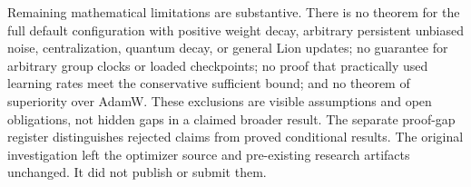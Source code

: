 \documentclass[11pt]{article}
\theoremstyle{definition}
\theoremstyle{remark}
\begin{document}
Remaining mathematical limitations are substantive. There is no theorem for
the full default configuration with positive weight decay, arbitrary
persistent unbiased noise, centralization, quantum decay, or general Lion
updates; no guarantee for arbitrary group clocks or loaded checkpoints; no
proof that practically used learning rates meet the conservative sufficient
bound; and no theorem of superiority over AdamW. These exclusions are visible
assumptions and open obligations, not hidden gaps in a claimed broader result.
The separate proof-gap register distinguishes rejected claims from proved
conditional results. The original investigation left the optimizer source and
pre-existing research artifacts unchanged. It did not publish or submit them.



\end{document}
